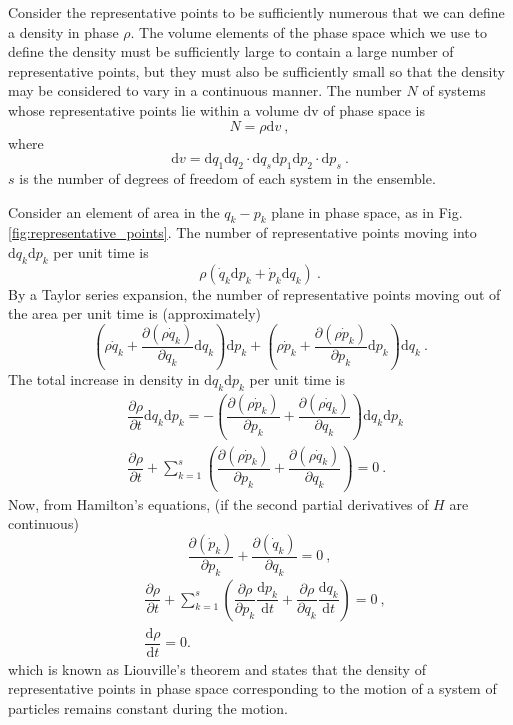 \documentclass[11pt,a4paper]{article}
\newcommand{\dif}{\mathrm{d}}
\newcounter{theo}[section]\setcounter{theo}{0}
\begin{document}
Consider the representative points to be sufficiently numerous that we can define a density in phase $\rho$. The volume elements of the phase space which we use to define the density must be sufficiently large to contain a large number of representative points, but they must also be sufficiently small so that the density may be considered to vary in a continuous manner. The number $N$ of systems whose representative points lie within a volume dv of phase space is
\begin{equation}
N = \rho \dif v ~,
\end{equation}
where
\begin{equation}
\dif v = \dif q_1 \dif q_2 \cdot \dif q_s \dif p_1 \dif p_2 \cdot \dif p_s ~.
\end{equation}
$s$ is the number of degrees of freedom of each system in the ensemble.

Consider an element of area in the $q_k-p_k$ plane in phase space, as in Fig. \ref{fig:representative_points}. The number of representative points moving into $\dif q_k \dif p_k$ per unit time is
\begin{equation}
\rho (\dot{q}_k \dif p_{k} + \dot{p}_k \dif q_k) ~.
\end{equation}
By a Taylor series expansion, the number of representative points moving out of the area per unit time is (approximately)
\begin{equation}
\left(\rho \dot{q}_k + \dfrac{\partial (\rho \dot{q}_k)}{\partial q_k} \dif q_k \right) \dif p_k + \left(\rho \dot{p}_k + \dfrac{\partial (\rho \dot{p}_k)}{\partial p_k} \dif p_k \right) \dif q_k ~.
\end{equation}
The total increase in density in $\dif q_k \dif p_k$ per unit time is
\begin{align}
& \dfrac{\partial \rho}{\partial t} \dif q_k \dif p_k = - \left(\dfrac{\partial (\rho \dot{p}_k)}{\partial p_k} + \dfrac{\partial (\rho \dot{q}_k)}{\partial q_k} \right) \dif q_k\dif p_k \\
& \dfrac{\partial \rho}{\partial t} + \sum_{k=1}^s \left(\dfrac{\partial (\rho \dot{p}_k)}{\partial p_k} + \dfrac{\partial (\rho \dot{q}_k)}{\partial q_k} \right) = 0 ~.
\end{align}
Now, from Hamilton's equations, (if the second partial derivatives of $H$ are continuous)
\begin{equation}
\dfrac{\partial (\dot{p}_k)}{\partial p_k} + \dfrac{\partial (\dot{q}_k)}{\partial q_k} = 0 ~,
\end{equation}
\begin{align}
& \dfrac{\partial \rho}{\partial t} + \sum_{k=1}^s \left(\dfrac{\partial \rho}{\partial p_k} \dfrac{\dif p_k}{\dif t} + \dfrac{\partial \rho}{\partial q_k} \dfrac{\dif q_k}{\dif t} \right) = 0 ~, \\
& \dfrac{\dif \rho}{\dif t} = 0.
\end{align}
which is known as Liouville's theorem and states that the density of representative points in phase space corresponding to the motion of a system of particles remains constant during the motion.
\end{document}
